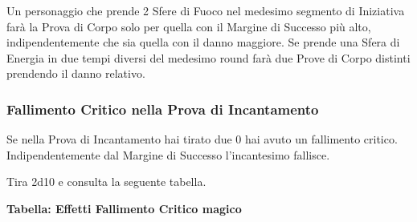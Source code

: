 \documentclass[12pt,a4paper,twoside,openany]{book}
\begin{document}
\begin{multicols}{2}
Un personaggio che prende 2 Sfere di Fuoco nel medesimo segmento di Iniziativa farà la Prova di Corpo solo per quella con il Margine di Successo più alto, indipendentemente che sia quella con il danno maggiore. Se prende una Sfera di Energia in due tempi diversi del medesimo round farà due Prove di Corpo distinti prendendo il danno relativo.

\subsubsection{Fallimento Critico nella Prova di Incantamento}\label{magiefallimentocriticonellaprovadimagia}

Se nella Prova di Incantamento hai tirato due 0 hai avuto un fallimento critico. Indipendentemente dal Margine di Successo l'incantesimo fallisce.

Tira 2d10 e consulta la seguente tabella.


\textbf{Tabella: Effetti Fallimento Critico magico}


\end{multicols}
\end{document}
